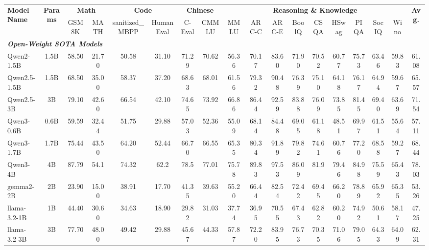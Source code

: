 







\begin{tabular}{lccccccccccccccccc}
\toprule
\multirow{2}{*}{\textbf{Model Name}} & \multirow{2}{*}{\textbf{Params}} & \multicolumn{2}{c}{\textbf{Math}} & \multicolumn{2}{c}{\textbf{Code}} & \multicolumn{2}{c}{\textbf{Chinese}} & \multicolumn{9}{c}{\textbf{Reasoning \& Knowledge}} & \multirow{2}{*}{\textbf{Avg.}} \\
\cmidrule(lr){3-4} \cmidrule(lr){5-6} \cmidrule(lr){7-8} \cmidrule(lr){9-17}
 &  & GSM8K & MATH & sanitized\_MBPP & HumanEval & C-Eval & CMMLU & MMLU & ARC-C & ARC-E & BoolQ & CSQA & HSwag & PIQA & SocIQ & Wino & \\
\midrule

\multicolumn{18}{l}{\textit{\textbf{Open-Weight SOTA Models}}} \\
\rowcolor{openweight} Qwen2-1.5B & 1.5B & 58.50 & 21.70 & 50.58 & 31.10 & 71.29 & 70.62 & 56.36 & 70.17 & 83.60 & 71.90 & 70.52 & 60.77 & 75.73 & 63.46 & 59.83 & 61.08 \\
\rowcolor{openweight} Qwen2.5-1.5B & 1.5B & 68.50 & 35.00 & 58.37 & 37.20 & 68.63 & 68.01 & 61.56 & 79.32 & 90.48 & 76.39 & 75.10 & 64.18 & 76.17 & 64.94 & 59.67 & 65.57 \\
\rowcolor{openweight} Qwen2.5-3B   & 3B   & 79.10 & 42.60 & 66.54 & 42.10 & 74.65 & 73.92 & 66.86 & 86.44 & 92.59 & 83.88 & 76.09 & 73.85 & 81.45 & 69.40 & 63.69 & 71.54 \\
\rowcolor{openweight} Qwen3-0.6B   & 0.6B & 59.59 & 32.44 & 51.75 & 29.88 & 57.03 & 52.36 & 55.09 & 68.14 & 84.48 & 69.05 & 61.18 & 48.51 & 69.97 & 61.51 & 55.64 & 57.11 \\
\rowcolor{openweight} Qwen3-1.7B   & 1.7B & 75.44 & 43.50 & 64.20 & 52.44 & 66.70 & 66.55 & 65.35 & 80.34 & 91.89 & 79.82 & 74.61 & 60.76 & 77.20 & 68.58 & 59.27 & 68.44 \\
\rowcolor{openweight} Qwen3-4B     & 4B   & 87.79 & 54.1 & 74.32 & 62.2 & 78.5 & 77.01 & 75.78 & 89.83 & 97.53 & 86.09 & 81.9 & 79.46 & 84.98 & 75.59 & 65.43 & 78.03 \\
\rowcolor{openweight} gemma2-2B    & 2B   & 23.90 & 15.00 & 38.91 & 17.70 & 41.35 & 39.63 & 55.20 & 66.44 & 82.54 & 72.42 & 69.45 & 66.20 & 78.89 & 65.92 & 65.35 & 53.26 \\
\rowcolor{openweight} llama-3.2-1B & 1B   &  44.40 & 30.60 & 34.63 & 18.90 & 29.82 & 31.03 & 37.74 & 36.95 & 70.55 & 67.43 & 62.82 & 60.20 & 74.92 & 50.61 & 58.17 & 47.25 \\
\rowcolor{openweight} llama-3.2-3B & 3B   & 77.70 & 48.00 & 49.42 & 29.88 & 45.67 & 44.33 & 57.87 & 72.20 & 83.95 & 76.73 & 70.35 & 71.06 & 79.05 & 64.33 & 64.09 & 62.31 \\


\end{tabular}
